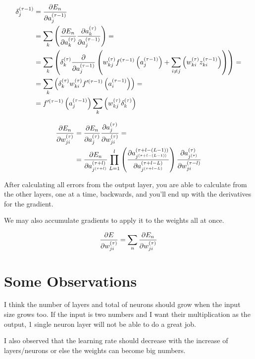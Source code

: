 \documentclass[a4paper,12pt]{article}
\theoremstyle{mytheoremstyle}
\theoremstyle{mytheoremstyle}
\theoremstyle{myproblemstyle}
\begin{document}
    \begin{equation}
        \begin{split}
            \delta_{j}^{\left( \tau - {1} \right)} & = \frac{\partial {E_{n}}}{\partial {a_{j}^{\left( \tau - {1} \right)}}} \\
            & = \displaystyle\sum_{k} \left( \frac{\partial {E_{n}}}{\partial {a_{k}^{\left( \tau \right)}}} \frac{\partial {a_{k}^{\left( \tau \right)}}}{\partial {a_{j}^{\left( \tau - {1} \right)}}} \right) = \\
            & = \displaystyle\sum_{k} \left( \delta_{k}^{\left( \tau \right)} \frac{\partial {}}{\partial {a_{j}^{\left( \tau - {1} \right)}}} \left( w_{kj}^{\left( \tau \right)} f^{\left( \tau - {1} \right)} \left( a_{j}^{\left( \tau - {1} \right)} \right) + \displaystyle\sum_{i \neq j} \left( w_{ki}^{\left( \tau \right)} z_{ki}^{\left( \tau - {1} \right)} \right) \right) \right) = \\
            & = \displaystyle\sum_{k} \left( \delta_{k}^{\left( \tau \right)} w_{ki}^{\left( \tau \right)} f^{\prime \left( \tau - {1} \right)} \left( a_{i}^{\left( \tau - {1} \right)} \right)  \right) = \\
            & = f^{\prime \left( \tau - {1} \right)} \left( a_{j}^{\left( \tau - {1} \right)} \right) \displaystyle\sum_{k} \left( w_{kj}^{\left( \tau \right)} \delta_{k}^{\left( \tau \right)} \right)
        \end{split}
    \end{equation}

    \begin{equation}
        \begin{split}
            \frac{\partial {E_{n}}}{\partial {w_{ji}^{\left( \tau \right)}}} & = \frac{\partial {E_{n}}}{\partial {a_{j}^{\left( \tau \right)}}} \frac{\partial {a_{j}^{\left( \tau \right)}}}{\partial {w_{ji}^{\left( \tau \right)}}} = \\
            & = \frac{\partial {E_{n}}}{\partial {a_{j^{\left( \tau + {l} \right)}}^{\left( \tau + {l} \right)}}} \displaystyle\prod_{L = 1}^{l} \left( \frac{\partial {a_{j^{\left( \tau + {l - \left( L - 1 \right)} \right)}}^{\left( \tau + {l - \left( L - 1 \right)} \right)}}}{\partial {a_{j^{\left( \tau + {l - L} \right)}}^{\left( \tau + {l - L} \right)}}} \right) \frac{\partial {a_{j^{\left( \tau \right)}}^{\left( \tau \right)}}}{\partial {w_{ji}^{\left( \tau - {l} \right)}}}
        \end{split}
    \end{equation}

    After calculating all errors from the output layer, you are able to
    calculate from the other layers, one at a time, backwards, and you'll end
    up with the derivatives for the gradient.

    We may also accumulate gradients to apply it to the weights all at once.

    \begin{equation}
        \frac{\partial {E}}{\partial {w_{ji}^{\left( \tau \right)}}} = \displaystyle\sum_{n} \frac{\partial {E_{n}}}{\partial {w_{ji}^{\left( \tau \right)}}}
    \end{equation}

    \section{Some Observations}

    I think the number of layers and total of neurons should grow when the
    input size grows too. If the input is two numbers and I want their
    multiplication as the output, 1 single neuron layer will not be able to do
    a great job.

    I also observed that the learning rate should decrease with the increase of
    layers/neurons or else the weights can become big numbers.

    \medskip

    \printbibliography[
    heading=bibintoc,
    category=cited
    ]

    \printbibliography[
    heading=bibintoc,
    notcategory=cited,
    title={Other Resources}
    ]
\end{document}
